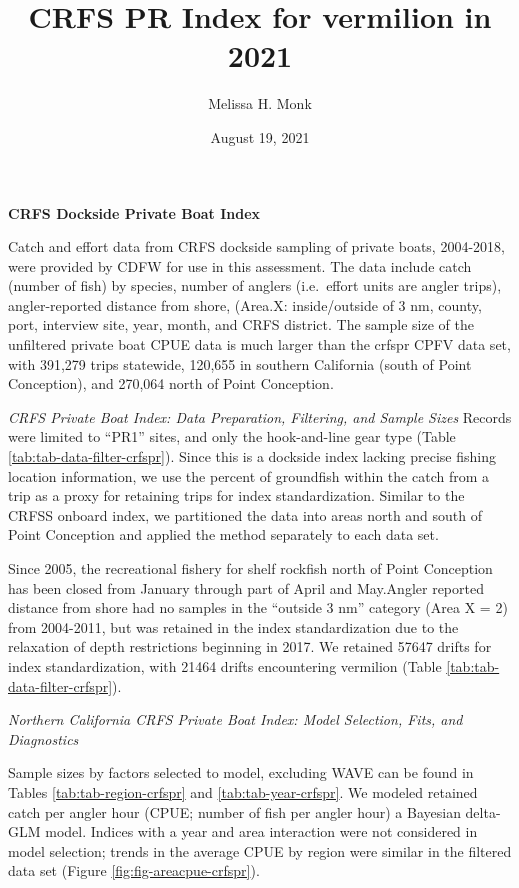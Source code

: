 \documentclass[
]{article}
\title{CRFS PR Index for vermilion in 2021}
\author{Melissa H. Monk}
\date{August 19, 2021}
\begin{document}
\maketitle

{
\setcounter{tocdepth}{2}
\tableofcontents
}
\textbf{CRFS Dockside Private Boat Index}

Catch and effort data from CRFS dockside sampling of private boats, 2004-2018,
were provided by CDFW for use in this assessment. The data include catch (number
of fish) by species, number of anglers (i.e.~effort units are angler trips),
angler-reported distance from shore, (Area.X: inside/outside of 3 nm, county, port,
interview site, year, month, and CRFS district. The sample size of the
unfiltered private boat CPUE data is much larger than the crfspr CPFV data set,
with 391,279 trips statewide, 120,655 in southern California (south
of Point Conception), and 270,064 north of Point Conception.

\emph{CRFS Private Boat Index: Data Preparation, Filtering, and Sample Sizes}
Records were limited to ``PR1'' sites, and only the hook-and-line gear type
(Table \ref{tab:tab-data-filter-crfspr}).
Since this is a dockside index lacking precise fishing location information, we
use the percent of groundfish within the catch from a trip as a proxy for retaining
trips for index standardization. Similar to the CRFSS onboard index, we partitioned the
data into areas north and south of Point Conception and applied the method
separately to each data set.

Since 2005, the recreational fishery for shelf rockfish north of Point Conception
has been closed from January through part of April and May.Angler reported distance
from shore had no samples in the ``outside 3 nm'' category (Area X = 2)
from 2004-2011, but was retained in the index standardization due to the relaxation
of depth restrictions beginning in 2017. We retained 57647 drifts for
index standardization, with 21464 drifts encountering vermilion
(Table \ref{tab:tab-data-filter-crfspr}).

\emph{Northern California CRFS Private Boat Index: Model Selection, Fits, and Diagnostics}

Sample sizes by factors selected to model, excluding WAVE can be found in Tables
\ref{tab:tab-region-crfspr} and \ref{tab:tab-year-crfspr}.
We modeled retained catch per angler hour (CPUE; number of fish per angler hour)
a Bayesian delta-GLM model. Indices with a year and area interaction were not
considered in model selection; trends in the average CPUE by region were similar
in the filtered data set (Figure \ref{fig:fig-areacpue-crfspr}).
\end{document}
